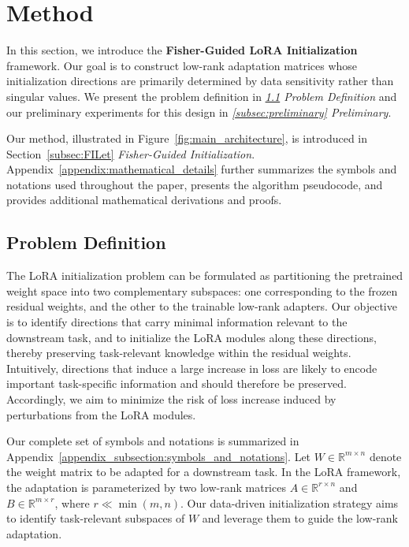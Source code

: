 \documentclass{article}
\theoremstyle{plain}
\theoremstyle{definition}
\theoremstyle{remark}
\begin{document}
\section{Method}
\label{sec:method}

In this section, we introduce the \textbf{Fisher-Guided LoRA Initialization} framework. Our goal is to construct low-rank adaptation matrices whose initialization directions are primarily determined by data sensitivity rather than singular values. We present the problem definition in \textit{\ref{subsec:problem_definition} Problem Definition} and our preliminary experiments for this design in \textit{\ref{subsec:preliminary} Preliminary}.


Our method, illustrated in Figure~\ref{fig:main_architecture}, is introduced in Section~\ref{subsec:FILet} \textit{Fisher-Guided Initialization}. Appendix~\ref{appendix:mathematical_details} further summarizes the symbols and notations used throughout the paper, presents the algorithm pseudocode, and provides additional mathematical derivations and proofs.

\subsection{Problem Definition}
\label{subsec:problem_definition}



The LoRA initialization problem can be formulated as partitioning the pretrained weight space into two complementary subspaces: one corresponding to the frozen residual weights, and the other to the trainable low-rank adapters. Our objective is to identify directions that carry minimal information relevant to the downstream task, and to initialize the LoRA modules along these directions, thereby preserving task-relevant knowledge within the residual weights. Intuitively, directions that induce a large increase in loss are likely to encode important task-specific information and should therefore be preserved. Accordingly, we aim to minimize the risk of loss increase induced by perturbations from the LoRA modules.

Our complete set of symbols and notations is summarized in Appendix~\ref{appendix_subsection:symbols_and_notations}.
Let $W \in \mathbb{R}^{m \times n}$ denote the weight matrix to be adapted for a downstream task.
In the LoRA framework, the adaptation is parameterized by two low-rank matrices $A \in \mathbb{R}^{r \times n}$ and $B \in \mathbb{R}^{m \times r}$, where $r \ll \min(m,n)$.
Our data-driven initialization strategy aims to identify task-relevant subspaces of $W$ and leverage them to guide the low-rank adaptation.
\end{document}
